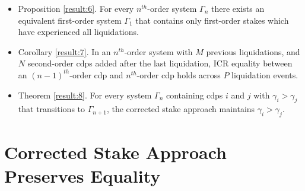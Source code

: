 \documentclass[reqno]{article}
\begin{document}
\begin{itemize}
  \item Proposition \ref{result:6}. For every $n^{th}$-order system $\Gamma_n$ there exists an equivalent first-order system $\Gamma_1$ that contains only first-order stakes which have experienced all liquidations.

  \item Corollary \ref{result:7}. In an $n^{th}$-order system with $M$ previous liquidations, and $N$ second-order cdps added after the last liquidation, ICR equality between an $(n-1)^{th}$-order cdp and $n^{th}$-order cdp holds across $P$ liquidation events.

  \item Theorem \ref{result:8}. For every system $\Gamma_n$ containing cdps $i$ and $j$ with $\gamma_i > \gamma_j$ that transitions to $\Gamma_{n+1}$, the corrected stake approach maintains $\gamma_i > \gamma_j$.
\end{itemize}


\section{Corrected Stake Approach Preserves Equality}






\end{document}
